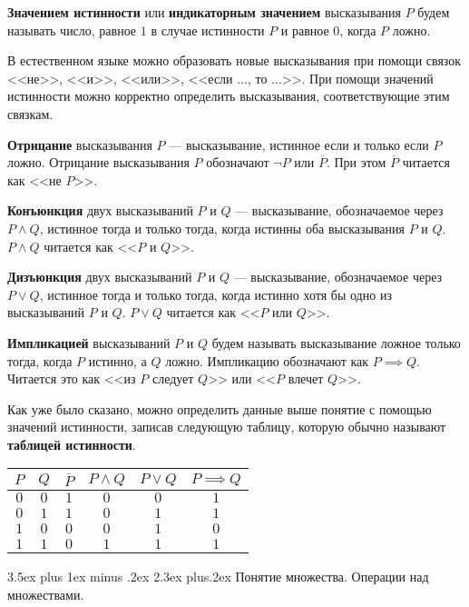 \documentclass[12pt, russian]{article}
\makeatletter
\renewcommand\subsection{\@startsection {subsection}{2}{\parindent}%
{3.5ex plus 1ex minus .2ex}%
{2.3ex plus.2ex}%
{\normalfont\large\bfseries}}
\makeatother
\begin{document}
\textbf{Значением истинности} или \textbf{индикаторным значением} высказывания $P$ будем называть число, равное $1$ в случае истинности $P$ и равное $0$, когда $P$ ложно.

В естественном языке можно образовать новые высказывания при помощи связок <<не>>, <<и>>, <<или>>, <<если ..., то ...>>. При помощи значений истинности можно корректно определить высказывания, соответствующие этим связкам.

\textbf{Отрицание} высказывания $P$ --- высказывание, истинное если  и только если $P$ ложно. Отрицание высказывания $P$ обозначают $\neg P$ или $\overline{P}$. При этом $\overline{P}$ читается как <<не $P$>>.

\textbf{Конъюнкция} двух высказываний $P$ и $Q$ --- высказывание, обозначаемое через $P \wedge Q$, истинное тогда и только тогда, когда истинны оба высказывания $P$ и $Q$. $P \wedge Q$ читается как <<$P$ и $Q$>>.

\textbf{Дизъюнкция} двух высказываний $P$ и $Q$ --- высказывание, обозначаемое через $P \vee Q$, истинное тогда и только тогда, когда истинно хотя бы одно из высказываний $P$ и $Q$. $P \vee Q$ читается как <<$P$ или $Q$>>. 

\textbf{Импликацией} высказываний $P$ и $Q$ будем называть высказывание ложное только тогда, когда $P$ истинно, а $Q$ ложно. Импликацию обозначают как $P \implies Q$. Читается это как <<из $P$ следует $Q$>> или <<$P$ влечет $Q$>>.

Как уже было сказано, можно определить данные выше понятие с помощью значений истинности, записав следующую таблицу, которую обычно называют \textbf{таблицей истинности}.

\begin{center}
\begin{tabular}{ |c|c|c|c|c|c| } 
	\hline
		$P$ & $Q$ & $\overline{P}$  & $P\wedge Q$ & $P \vee Q$ & $P \implies Q$\\ \hline
		$0$ & $0$ & $1$ & $0$ & $0$ & $1$ \\ \hline
		$0$ & $1$ & $1$ & $0$ & $1$ & $1$ \\ \hline
		$1$ & $0$ & $0$ & $0$ & $1$ & $0$ \\ \hline
		$1$ & $1$ & $0$ & $1$ & $1$ & $1$ \\
	\hline
\end{tabular}
\end{center}


\subsection{Понятие множества. Операции над множествами.}
\end{document}
